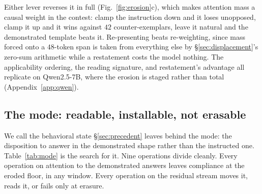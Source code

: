 \documentclass{article}
\begin{document}
Either lever reverses it in full (Fig.~\ref{fig:erosion}c), which makes attention mass a causal
weight in the contest: clamp the instruction down and it loses unopposed, clamp it up and it
wins against $42$ counter-exemplars, leave it natural and the demonstrated template beats it.
Re-presenting beats re-weighting, since mass forced onto a $48$-token span is taken from
everything else by \S\ref{sec:displacement}'s zero-sum arithmetic while a restatement costs the
model nothing. The applicability ordering, the reading signature, and restatement's advantage
all replicate on Qwen2.5-7B, where the erosion is staged rather than total
(Appendix~\ref{app:qwen}).

\subsection{The mode: readable, installable, not erasable}
\label{sec:mode}

We call the behavioral state \S\ref{sec:precedent} leaves behind the mode: the disposition to
answer in the demonstrated shape rather than the instructed one. Table~\ref{tab:mode} is the
search for it. Nine operations divide cleanly. Every operation on attention to the
demonstrated answers leaves compliance at the eroded floor, in any window. Every operation on
the residual stream moves it, reads it, or fails only at erasure.
\end{document}
